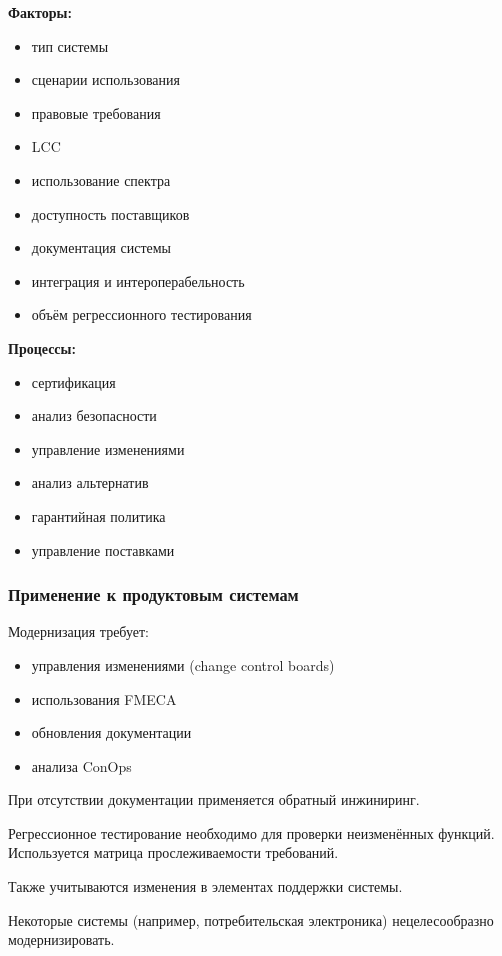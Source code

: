\documentclass[14pt,a4paper]{extarticle}
\begin{document}
\textbf{Факторы:}

\begin{itemize}
\item тип системы
\item сценарии использования
\item правовые требования
\item LCC
\item использование спектра
\item доступность поставщиков
\item документация системы
\item интеграция и интероперабельность
\item объём регрессионного тестирования
\end{itemize}

\textbf{Процессы:}

\begin{itemize}
\item сертификация
\item анализ безопасности
\item управление изменениями
\item анализ альтернатив
\item гарантийная политика
\item управление поставками
\end{itemize}

\subsubsection{Применение к продуктовым системам}

Модернизация требует:

\begin{itemize}
\item управления изменениями (change control boards)
\item использования FMECA
\item обновления документации
\item анализа ConOps
\end{itemize}

При отсутствии документации применяется обратный инжиниринг.

Регрессионное тестирование необходимо для проверки неизменённых функций. Используется матрица прослеживаемости требований.

Также учитываются изменения в элементах поддержки системы.

Некоторые системы (например, потребительская электроника) нецелесообразно модернизировать.
\end{document}
